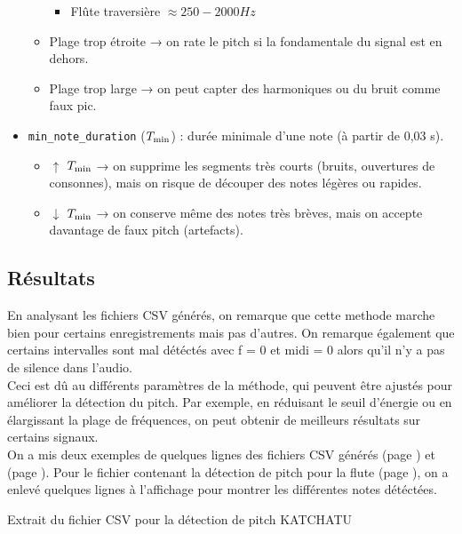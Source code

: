 \begin{itemize}
\begin{itemize}
\begin{itemize}
          \item Flûte traversière $\approx 250-2000 Hz$  
        \end{itemize}
      \item Plage trop étroite → on rate le pitch si la fondamentale du signal est en dehors.  
      \item Plage trop large → on peut capter des harmoniques ou du bruit comme faux pic.  
    \end{itemize}
  \item \texttt{min\_note\_duration} (\(T_\mathrm{min}\)) : durée minimale d’une note (à partir de 0,03 s).  
    \begin{itemize}
      \item $\uparrow$ \(T_\mathrm{min}\) → on supprime les segments très courts (bruits, ouvertures de consonnes), mais on risque de découper des notes légères ou rapides.  
      \item $\downarrow$ \(T_\mathrm{min}\) → on conserve même des notes très brèves, mais on accepte davantage de faux pitch (artefacts).  
    \end{itemize}
\end{itemize}

\subsection{Résultats}

En analysant les fichiers CSV générés, on remarque que cette methode marche bien pour certains enregistrements mais pas d'autres. On remarque également que certains intervalles sont mal détéctés avec f = 0 et midi = 0 alors qu'il n'y a pas de silence dans l'audio.\\

Ceci est dû au différents paramètres de la méthode, qui peuvent être ajustés pour améliorer la détection du pitch. Par exemple, en réduisant le seuil d'énergie ou en élargissant la plage de fréquences, on peut obtenir de meilleurs résultats sur certains signaux.\\

On a mis deux exemples de quelques lignes des fichiers CSV générés (page \pageref{tab:katchatu}) et (page \pageref{tab:flute}). Pour le fichier contenant la détection de pitch pour la flute (page \pageref{tab:flute}), on a enlevé quelques lignes à l'affichage pour montrer les différentes notes détéctées.

\begin{table}[h]
\centering
\caption{Extrait du fichier CSV pour la détection de pitch KATCHATU} 
\label{tab:katchatu}
\end{table}

